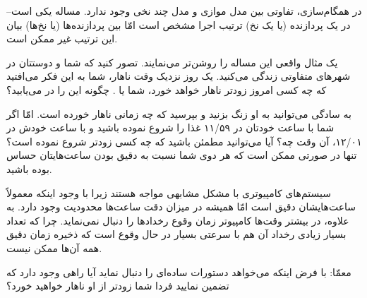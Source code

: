\documentclass{book}
\begin{document}

    در همگام‌سازی، تفاوتی بین مدل موازی و مدل چند نخی وجود ندارد. 
    مساله یکی است--در یک پردازنده (یا یک نخ) ترتیب اجرا مشخص است امّا بین پردازنده‌ها (یا نخ‌ها) بیان این ترتیب غیر ممکن است. 
    
    یک مثال واقعی این مساله را روشن‌تر می‌نمایند. 
    تصور کنید که شما و دوستتان  در شهرهای متفاوتی زندگی می‌کنید. یک روز نزدیک وقت ناهار، شما به این فکر می‌افتید که 
    چه کسی امروز زودتر ناهار خواهد خورد، شما یا . چگونه این را در می‌یابید؟ 
    

    به سادگی می‌توانید به او زنگ بزنید و بپرسید که چه زمانی ناهار خورده است. امّا اگر شما با ساعت خودتان در ۱۱/۵۹ غذا را شروع نموده باشید 
    و  با ساعت خودش در ۱۲/۰۱، آن وقت چه؟ آیا می‌توانید مطمئن باشید که چه کسی زودتر شروع نموده است؟ 
    تنها در صورتی ممکن است که هر دوی شما نسبت به دقیق بودن ساعت‌هایتان حساس بوده باشید.


    سیستم‌های کامپیوتری با مشکل مشابهی مواجه هستند زیرا با وجود اینکه معمولاً ساعت‌هایشان دقیق است امّا همیشه 
    در میزان دقت ساعت‌ها محدودیت وجود دارد. به علاوه، در بیشتر وقت‌ها کامپیوتر زمان وقوع رخدادها را دنبال نمی‌نماید. 
    چرا که تعداد بسیار زیادی رخداد آن هم با سرعتی بسیار در حال وقوع است که ذخیره  زمان دقیق همه آن‌ها ممکن نیست. 
    
    معمّا: با فرض اینکه  می‌خواهد دستورات ساده‌ای را دنبال نماید آیا راهی وجود دارد که تضمین نمایید فردا شما زودتر از او ناهار خواهید خورد؟
    
\end{document}
